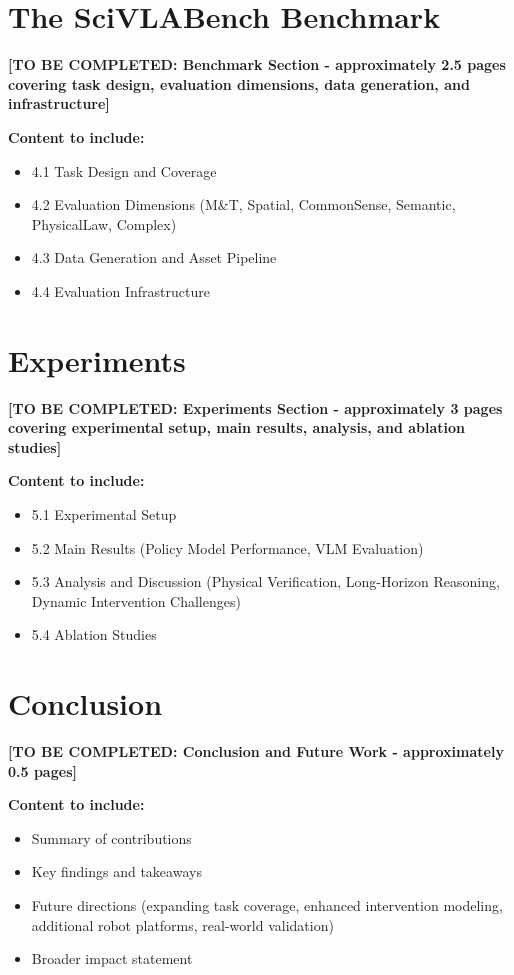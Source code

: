\documentclass[sigconf]{acmart}
\begin{document}
\section{The SciVLABench Benchmark}
\label{sec:benchmark}

\textbf{[TO BE COMPLETED: Benchmark Section - approximately 2.5 pages covering task design, evaluation dimensions, data generation, and infrastructure]}

\textbf{Content to include:}
\begin{itemize}
    \item 4.1 Task Design and Coverage
    \item 4.2 Evaluation Dimensions (M\&T, Spatial, CommonSense, Semantic, PhysicalLaw, Complex)
    \item 4.3 Data Generation and Asset Pipeline
    \item 4.4 Evaluation Infrastructure
\end{itemize}

\section{Experiments}
\label{sec:experiments}

\textbf{[TO BE COMPLETED: Experiments Section - approximately 3 pages covering experimental setup, main results, analysis, and ablation studies]}

\textbf{Content to include:}
\begin{itemize}
    \item 5.1 Experimental Setup
    \item 5.2 Main Results (Policy Model Performance, VLM Evaluation)
    \item 5.3 Analysis and Discussion (Physical Verification, Long-Horizon Reasoning, Dynamic Intervention Challenges)
    \item 5.4 Ablation Studies
\end{itemize}

\section{Conclusion}
\label{sec:conclusion}

\textbf{[TO BE COMPLETED: Conclusion and Future Work - approximately 0.5 pages]}

\textbf{Content to include:}
\begin{itemize}
    \item Summary of contributions
    \item Key findings and takeaways
    \item Future directions (expanding task coverage, enhanced intervention modeling, additional robot platforms, real-world validation)
    \item Broader impact statement
\end{itemize}
\end{document}
